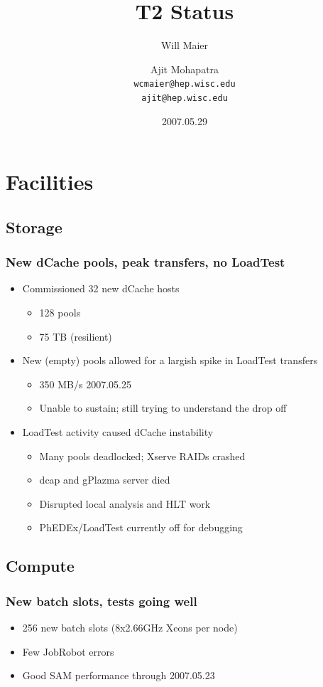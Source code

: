 \documentclass{beamer}
\title{T2 Status}
\author[Maier, Mohapatra]{
    Will Maier \and Ajit Mohapatra\\ 
    {\tt wcmaier@hep.wisc.edu}\\
    {\tt ajit@hep.wisc.edu}}
\institute[Wisconsin]{University of Wisconsin - High Energy Physics}
\date{2007.05.29}
\begin{document}
\begin{frame}
    \titlepage
\end{frame}


\section{Facilities}
\subsection{Storage}
\begin{frame}
\frametitle{New dCache pools, peak transfers, no LoadTest}
\begin{itemize}
    \item Commissioned 32 new dCache hosts
    \begin{itemize}
        \item 128 pools
        \item 75 TB (resilient)
    \end{itemize}
    \item New (empty) pools allowed for a largish spike in LoadTest transfers
    \begin{itemize}
        \item 350 MB/s 2007.05.25
        \item Unable to sustain; still trying to understand the drop off
    \end{itemize}
    \item LoadTest activity caused dCache instability
    \begin{itemize}
        \item Many pools deadlocked; Xserve RAIDs crashed
        \item dcap and gPlazma server died
        \item Disrupted local analysis and HLT work
        \item PhEDEx/LoadTest currently off for debugging
    \end{itemize}
\end{itemize}
\end{frame}

\subsection{Compute}
\begin{frame}
\frametitle{New batch slots, tests going well}
\begin{itemize}
    \item 256 new batch slots (8x2.66GHz Xeons per node)
    \item Few JobRobot errors
    \item Good SAM performance through 2007.05.23
\end{itemize}
\end{frame}
\end{document}
